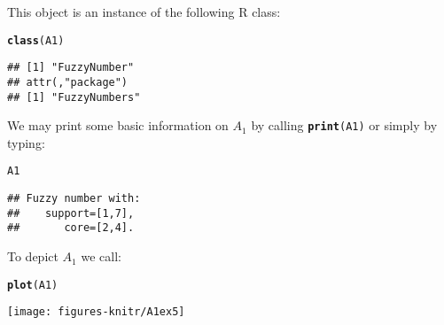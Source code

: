 \documentclass[11pt]{article}\usepackage{graphicx, color}
\makeatletter
\newcommand{\hlfunctioncall}[1]{\textcolor[rgb]{0.501960784313725,0,0.329411764705882}{\textbf{#1}}}%
\newenvironment{kframe}{%
 \def\at@end@of@kframe{}%
 \ifinner\ifhmode%
  \def\at@end@of@kframe{\end{minipage}}%
  \begin{minipage}{\columnwidth}%
 \fi\fi%
 \def\FrameCommand##1{\hskip\@totalleftmargin \hskip-\fboxsep
 \colorbox{shadecolor}{##1}\hskip-\fboxsep
     \hskip-\linewidth \hskip-\@totalleftmargin \hskip\columnwidth}%
 \MakeFramed {\advance\hsize-\width
   \@totalleftmargin\z@ \linewidth\hsize
   \@setminipage}}%
 {\par\unskip\endMakeFramed%
 \at@end@of@kframe}
\newenvironment{knitrout}{}{} %
\newcommand{\lang}[1]{\textsf{#1}\xspace}
\newcommand{\R}{\lang{R}}
\newcommand{\func}[1]{\texttt{\hlfunctioncall{#1}}}
\makeatother
\begin{document}
\noindent
This object is an instance of the following \R class:

\begin{knitrout}\small
{}\color{fgcolor}\begin{kframe}
\begin{alltt}
\hlfunctioncall{class}(A1)
\end{alltt}
\begin{verbatim}
## [1] "FuzzyNumber"
## attr(,"package")
## [1] "FuzzyNumbers"
\end{verbatim}
\end{kframe}
\end{knitrout}


\noindent
We may print some basic information on $A_1$ by calling \texttt{\func{print}(A1)} or
simply by typing:

\begin{knitrout}\small
{}\color{fgcolor}\begin{kframe}
\begin{alltt}
A1
\end{alltt}
\begin{verbatim}
## Fuzzy number with:
##    support=[1,7],
##       core=[2,4].
\end{verbatim}
\end{kframe}
\end{knitrout}


\noindent
To depict $A_1$ we call:

\begin{knitrout}\small
{}\color{fgcolor}\begin{kframe}
\begin{alltt}
\hlfunctioncall{plot}(A1)
\end{alltt}
\end{kframe}
\end{knitrout}


\begin{center}
\begin{knitrout}\small
{}\color{fgcolor}

{\centering \texttt{[image: figures-knitr/A1ex5]} 

}



\end{knitrout}

\end{center}
\end{document}
